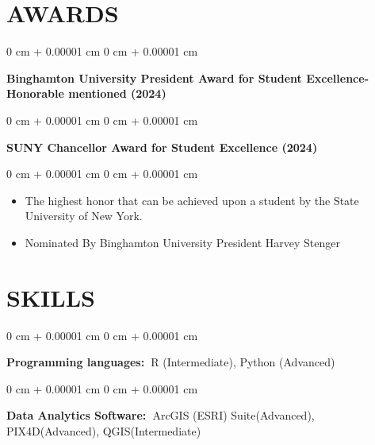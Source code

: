 \documentclass[10pt, letterpaper]{article}
\newenvironment{highlights}{
    \begin{itemize}[
        topsep=0.10 cm,
        parsep=0.10 cm,
        partopsep=0pt,
        itemsep=0pt,
        leftmargin=0 cm + 10pt
    ]
}{
    \end{itemize}
} %
\newenvironment{onecolentry}{
    \begin{adjustwidth}{
        0 cm + 0.00001 cm
    }{
        0 cm + 0.00001 cm
    }
}{
    \end{adjustwidth}
} %
\begin{document}
    

    
    \section{AWARDS}

        \begin{onecolentry}
                    \textbf{\textbf{Binghamton University President Award for Student Excellence-Honorable mentioned (2024)}}
        \end{onecolentry}

                \begin{onecolentry}
                    \textbf{\textbf{\textbf{SUNY Chancellor Award for Student Excellence (2024)}
}}
        \end{onecolentry}
                \vspace{0.10 cm}
        \begin{onecolentry}
            \begin{highlights}
                \item The highest honor that can be achieved upon a student by the State University of New York. 
                \item Nominated By Binghamton University President Harvey Stenger
            \end{highlights}
        \end{onecolentry}

        





    
    \section{SKILLS}



        
        \begin{onecolentry}
            \textbf{\textbf{Programming languages: }}R (Intermediate), Python (Advanced)\textbf{ }
        \end{onecolentry}

        \vspace{0.1 cm}

        \begin{onecolentry}
            \textbf{\textbf{Data Analytics Software: }}ArcGIS (ESRI) Suite(Advanced), PIX4D(Advanced), QGIS(Intermediate)

        \end{onecolentry}
\end{document}

